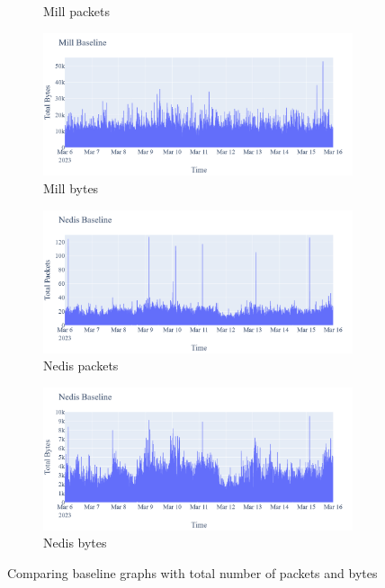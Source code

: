 \begin{figure}[H]
\begin{subfigure}[b]{0.4\textwidth}
        \caption{Mill packets}
    \end{subfigure}
    \begin{subfigure}[b]{0.4\textwidth}
        \centering
        \includegraphics[width=1\hsize]{figures/Mill_Baseline_TotalBytes.png}
        \caption{Mill bytes}
    \end{subfigure}
    \begin{subfigure}[b]{0.4\textwidth}
        \centering
        \includegraphics[width=1\hsize]{figures/Nedis_Baseline_TotalPackets.png}
        \caption{Nedis packets}
    \end{subfigure}
    \begin{subfigure}[b]{0.4\textwidth}
        \centering
        \includegraphics[width=1\hsize]{figures/Nedis_Baseline_TotalBytes.png}
        \caption{Nedis bytes}
    \end{subfigure}
    \caption{Comparing baseline graphs with total number of packets and bytes}
    \label{fig:ComparingBaselines}
\end{figure}

